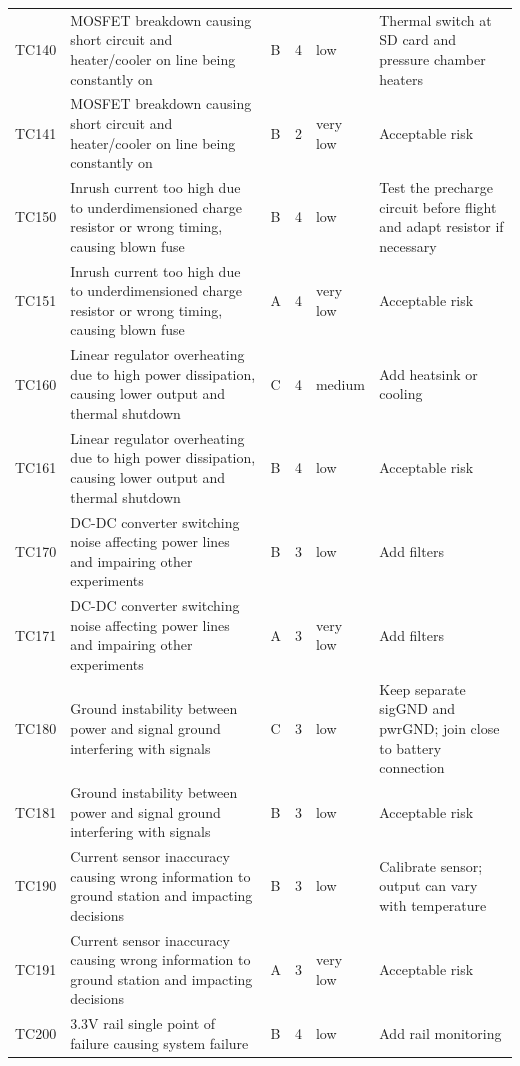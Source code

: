 \begin{longtable}{L{1.5cm}L{3cm}L{1cm}L{1cm}L{2cm}L{6cm}}
 TC140 & MOSFET breakdown causing short circuit and heater/cooler on line being constantly on & B & 4 & low & Thermal switch at SD card and pressure chamber heaters \\
 TC141 & MOSFET breakdown causing short circuit and heater/cooler on line being constantly on & B & 2 & very low & Acceptable risk \\
 TC150 & Inrush current too high due to underdimensioned charge resistor or wrong timing, causing blown fuse & B & 4 & low & Test the precharge circuit before flight and adapt resistor if necessary \\
 TC151 & Inrush current too high due to underdimensioned charge resistor or wrong timing, causing blown fuse & A & 4 & very low & Acceptable risk \\
 TC160 & Linear regulator overheating due to high power dissipation, causing lower output and thermal shutdown & C & 4 & medium & Add heatsink or cooling \\
 TC161 & Linear regulator overheating due to high power dissipation, causing lower output and thermal shutdown & B & 4 & low & Acceptable risk \\
 TC170 & DC-DC converter switching noise affecting power lines and impairing other experiments & B & 3 & low & Add filters \\
 TC171 & DC-DC converter switching noise affecting power lines and impairing other experiments & A & 3 & very low & Add filters \\
 TC180 & Ground instability between power and signal ground interfering with signals & C & 3 & low & Keep separate sigGND and pwrGND; join close to battery connection \\
 TC181 & Ground instability between power and signal ground interfering with signals & B & 3 & low & Acceptable risk \\
 TC190 & Current sensor inaccuracy causing wrong information to ground station and impacting decisions & B & 3 & low & Calibrate sensor; output can vary with temperature \\
 TC191 & Current sensor inaccuracy causing wrong information to ground station and impacting decisions & A & 3 & very low & Acceptable risk \\
 TC200 & 3.3V rail single point of failure causing system failure & B & 4 & low & Add rail monitoring \\

\end{longtable}
